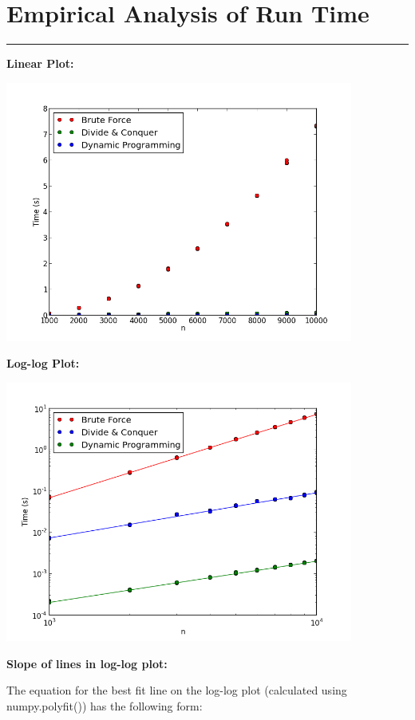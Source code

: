 \documentclass[letterpaper,10pt,titlepage,fleqn]{article}
\begin{document}
\section*{Empirical Analysis of Run Time}
\hrule
\textbf{Linear Plot:}
\vskip 0.04in
\begin{center}
\includegraphics[width=4.5in]{linear.png}
\end{center}
\textbf{Log-log Plot:}
\vskip 0.04in
\begin{center}
\includegraphics[width=4.5in]{loglog.png}
\end{center}

\newpage

\begin{centering}
\textbf{Slope of lines in log-log plot:}
\end{centering}

The equation for the best fit line on the log-log plot (calculated using numpy.polyfit()) has the following form:
\end{document}
